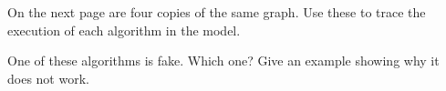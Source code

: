 \documentclass{tufte-handout}
\begin{document}
\begin{questions}
\item On the next page are four copies of the same graph.  Use these
  to trace the execution of each algorithm in the model.
  \begin{figure}
    \begin{center}
      
    \end{center}
  \end{figure}
\item One of these algorithms is fake.  Which one?  Give an example
  showing why it does not work.
\end{questions}
\end{document}
